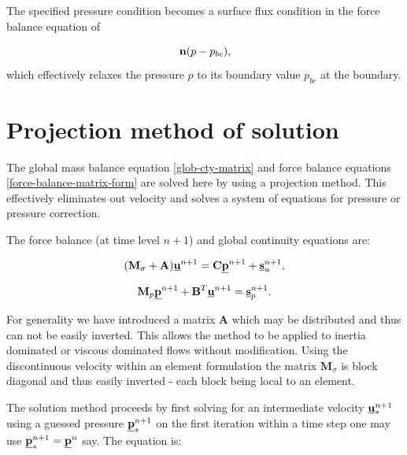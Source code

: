 The specified pressure condition becomes a surface flux 
condition in the force balance equation of 

\begin{equation}
{\bf n} (p-p_{bc}),
\end{equation}
which effectively relaxes the pressure $p$ to its boundary 
value $p_{bc}$ at the boundary. 


		

\section{Projection method of solution} 

The  
global mass balance equation \ref{glob-cty-matrix} and 
force balance equations \ref{force-balance-matrix-form} are solved here 
by using a projection method. This effectively eliminates 
out velocity and solves a system of equations for 
pressure or pressure correction. 

The force balance (at time level $n+1$) 
and global continuity equations are:

\begin{equation}
({\mathbf M}_\sigma +{\mathbf A}) \underline{\bf u}^{n+1} = {\mathbf C} \underline{\bf p}^{n+1} + \underline{\bf s}_u^{n+1},
\label{force-balance-matrix-form2}
\end{equation}

\begin{equation}
{\mathbf M}_p \underline{\bf p}^{n+1} + {\mathbf B}^T \underline{\bf u}^{n+1} = \underline{\bf s}_p^{n+1}. 
\label{glob-cty-matrix2}
\end{equation}

For generality we have introduced a matrix ${\mathbf A}$ which may be 
distributed and thus can not be easily inverted. 
This allows the method to be applied to inertia dominated 
or viscous dominated flows without modification. 
Using the discontinuous velocity within an element 
formulation the matrix ${\mathbf M}_\sigma$ is block diagonal 
and thus easily inverted - each block being local to an element. 

The solution method proceeds by first solving for 
an intermediate velocity $\underline{\bf u}^{n+1}_*$ using a 
guessed pressure $\underline{\bf p}^{n+1}_*$ on the first iteration 
within a time step one may use $\underline{\bf p}^{n+1}_*=\underline{\bf p}^n$ say. 
The equation is: 

